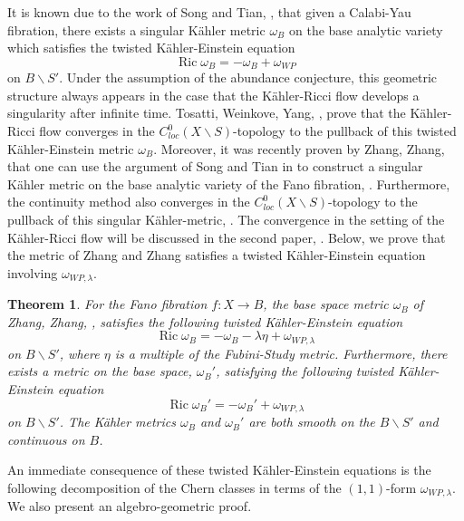 \documentclass[12pt]{article}
\newtheorem{theorem}{Theorem}[section]
\numberwithin{equation}{section}
\DeclareMathOperator{\Ric}{Ric}
\begin{document}
\noindent It is known due to the work of Song and Tian, \cite{ST07, ST12,T19}, that given a Calabi-Yau fibration, there exists a singular K\"ahler metric $\omega_B$ on the base analytic variety which satisfies the twisted K\"ahler-Einstein equation
\begin{equation*}
    \Ric \omega_B = -\omega_B + \omega_{WP}
\end{equation*}
on $B\backslash S'$. Under the assumption of the abundance conjecture, this geometric structure always appears in the case that the K\"ahler-Ricci flow develops a singularity after infinite time. Tosatti, Weinkove, Yang, \cite{TWY18,T19}, prove that the K\"ahler-Ricci flow converges in the $C^0_{loc}(X\backslash S)$-topology to the pullback of this twisted K\"ahler-Einstein metric $\omega_B$. Moreover, it was recently proven by Zhang, Zhang, that one can use the argument of Song and Tian in \cite{ST12} to construct a singular K\"ahler metric on the base analytic variety of the Fano fibration, \cite{ZZ20}. Furthermore, the continuity method also converges in the $C^0_{loc}(X\backslash S)$-topology to the pullback of this singular K\"ahler-metric, \cite{ZZ20}. The convergence in the setting of the K\"ahler-Ricci flow will be discussed in the second paper, \cite{B25}. Below, we prove that the metric of Zhang and Zhang satisfies a twisted K\"ahler-Einstein equation involving $\omega_{WP,\lambda}$.

\begin{theorem}
For the Fano fibration $f:X \to B$, the base space metric $\omega_B$ of Zhang, Zhang, \cite{ZZ20}, satisfies the following twisted K\"ahler-Einstein equation
\begin{equation*}
    \Ric \omega_{B} = -\omega_B -\lambda \eta +\omega_{WP,\lambda}
\end{equation*}
on $B \backslash S'$, where $\eta$ is a multiple of the Fubini-Study metric. Furthermore, there exists a metric on the base space, $\omega_{B}'$, satisfying the following twisted K\"ahler-Einstein equation
\begin{equation*}
    \Ric \omega_B' = -\omega_B' + \omega_{WP,\lambda}
\end{equation*}
on $B \backslash S'$. The K\"ahler metrics $\omega_B$ and $\omega_B'$ are both smooth on the $B\backslash S'$ and continuous on $B$.
\end{theorem}

\noindent An immediate consequence of these twisted K\"ahler-Einstein equations is the following decomposition of the Chern classes in terms of the $(1,1)$-form $\omega_{WP,\lambda}$. We also present an algebro-geometric proof.
\end{document}
